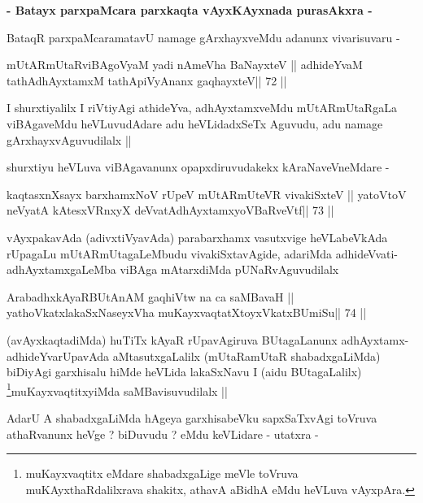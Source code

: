 \begin{center}
\textbf{- Batayx parxpaMcara parxkaqta vAyxKAyxnada purasAkxra  -}
\end{center}

\begin{artha}
BataqR parxpaMcaramatavU namage gArxhayxveMdu adanunx vivarisuvaru -
\end{artha}

\begin{shl}
mUtARmUtaRviBAgoV\s yaM yadi nAmeVha BaNayxteV ||
adhideYvaM tathA\s dhAyxtamxM tathA\s piVyAnanx gaqhayxteV\hfill || 72 ||
\end{shl}

\begin{artha}
I shurxtiyalilx I riVtiyAgi athideYva, adhAyxtamxveMdu mUtARmUtaRgaLa
viBAgaveMdu heVLuvudAdare adu heVLidadxSeTx Aguvudu, adu namage
gArxhayxvAguvudilalx ||

shurxtiyu heVLuva viBAgavanunx opapxdiruvudakekx kAraNaveVneMdare -
\end{artha}

\begin{shl}
kaqtasxnXsayx barxhamxNoV rUpeV mUtARmUteVR vivakiSxteV ||
yatoV\s toV neVyatA kAtesxVRnxyX deVvatAdhAyxtamxyoVBaRveVtf\hfill || 73 ||
\end{shl}

\begin{artha}
vAyxpakavAda (adivxtiVyavAda) parabarxhamx vasutxvige heVLabeVkAda
rUpagaLu mUtARmUtagaLeMbudu vivakiSxtavAgide, adariMda
adhideVvati-adhAyxtamxgaLeMba viBAga mAtarxdiMda pUNaRvAguvudilalx
\end{artha}

\begin{shl}
ArabadhxkAyaRBUtAnAM gaqhiVtw na ca saMBavaH ||
yathoVkatxlakaSxNaseyxVha muKayxvaqtatXtoyxVkatxBUmiSu\hfill || 74 ||
\end{shl}

\begin{artha}
(avAyxkaqtadiMda) huTiTx kAyaR rUpavAgiruva BUtagaLanunx
  adhAyxtamx-adhideYvarUpavAda aMtasutxgaLalilx (mUtaRamUtaR
  shabadxgaLiMda) biDiyAgi garxhisalu hiMde heVLida lakaSxNavu I (aidu
  BUtagaLalilx) \footnote[1]{muKayxvaqtitx eMdare shabadxgaLige meVle
    toVruva muKAyxthaRdalilxrava shakitx, athavA aBidhA eMdu heVLuva vAyxpAra.}muKayxvaqtitxyiMda saMBavisuvudilalx ||
\end{artha}

\begin{artha}
AdarU A shabadxgaLiMda hAgeya garxhisabeVku sapxSaTxvAgi toVruva
athaRvanunx heVge ? biDuvudu ? eMdu keVLidare - utatxra -
\end{artha}

